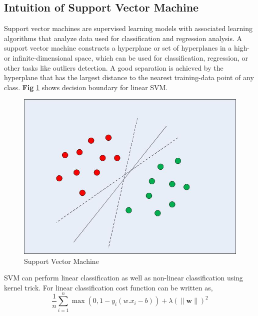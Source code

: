 \subsection{Intuition of Support Vector Machine}
Support vector machines are supervised learning models with associated learning algorithms that analyze data used for classification and regression analysis.  A support vector machine constructs a hyperplane or set of hyperplanes in a high- or infinite-dimensional space, which can be used for classification, regression, or other tasks like outliers detection. A good separation is achieved by the hyperplane that has the largest distance to the nearest training-data point of any class. \textbf{Fig} \ref{fig:SVM} shows decision boundary for linear SVM.


\begin{figure}[h!]
    \centering
    \includegraphics[scale=0.4]{Figures/svm.png}
    \caption{Support Vector Machine}
    \label{fig:SVM}
\end{figure}

SVM can perform linear classification as well as non-linear classification using kernel trick. For linear classification cost function can be written as,
\begin{equation}
    \label{cost_function_svm}
    \frac{1}{n}\sum_{i=1}^{n}\max{(0,1-y_{i}(w.x_{i}-b))} + \lambda (\lVert \mathbf{w} \rVert)^2
\end{equation}

